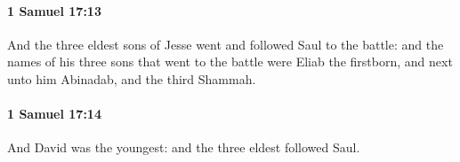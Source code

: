 		\paragraph{1 Samuel 17:13} %
			\label{1SAMUEL-17-13}

			And the three eldest sons of Jesse went and followed Saul to the battle: and the names of his three sons that went to the battle were Eliab the firstborn, and next unto him Abinadab, and the third Shammah.


		\paragraph{1 Samuel 17:14} %
			\label{1SAMUEL-17-14}

			And David was the youngest: and the three eldest followed Saul.


